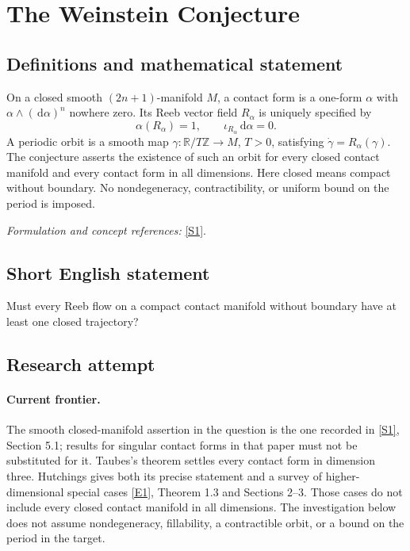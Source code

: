 \documentclass[11pt,a4paper]{article}
\newcommand{\Z}{\mathbb{Z}}
\newcommand{\R}{\mathbb{R}}
\newcommand{\dd}{\,\mathrm d}
\newcommand{\sref}[2]{\hyperlink{source:#1:#2}{[S#2]}}
\newcommand{\eref}[2]{\hyperlink{extra:#1:#2}{[E#2]}}
\newif\ifshowcatalogue
\newcommand{\cataloguescope}[1]{\ifshowcatalogue
 \paragraph{Exact scope in the supplied catalogue.}
 \begin{quote}\small #1\end{quote}\fi}
\numberwithin{equation}{section}
\begin{document}
\setcounter{section}{0}
\clearpage
\section*{\texorpdfstring{The Weinstein Conjecture}{The Weinstein Conjecture}}\label{statement}
\subsection{Definitions and mathematical statement}
On a closed smooth $(2n+1)$-manifold $M$, a contact form is a one-form $\alpha$ with $\alpha\wedge(\dd\alpha)^n$ nowhere zero. Its Reeb vector field $R_\alpha$ is uniquely specified by
\[
 \alpha(R_\alpha)=1,\qquad \iota_{R_\alpha}\dd\alpha=0.
\]
A periodic orbit is a smooth map $\gamma:\R/T\Z\to M$, $T>0$, satisfying $\dot\gamma=R_\alpha(\gamma)$. The conjecture asserts the existence of such an orbit for every closed contact manifold and every contact form in all dimensions. Here closed means compact without boundary. No nondegeneracy, contractibility, or uniform bound on the period is imposed.
\par\smallskip\textit{Formulation and concept references:} \sref{statement}{1}.
\cataloguescope{Prove that every closed contact manifold admits a periodic orbit of the Reeb flow of any contact form, in all dimensions.}
\subsection{Short English statement}
Must every Reeb flow on a compact contact manifold without boundary have at least one closed trajectory?
\subsection{Research attempt}

\paragraph{Current frontier.}
The smooth closed-manifold assertion in the question is the one recorded in
\sref{statement}{1}, Section 5.1; results for singular contact forms in that paper
must not be substituted for it. Taubes's theorem settles every contact form
in dimension three. Hutchings gives both its precise statement and a survey
of higher-dimensional special cases \eref{statement}{1}, Theorem 1.3 and
Sections 2--3. Those cases do not include every closed contact manifold in
all dimensions. The investigation below does not assume nondegeneracy,
fillability, a contractible orbit, or a bound on the period in the target.
\end{document}
